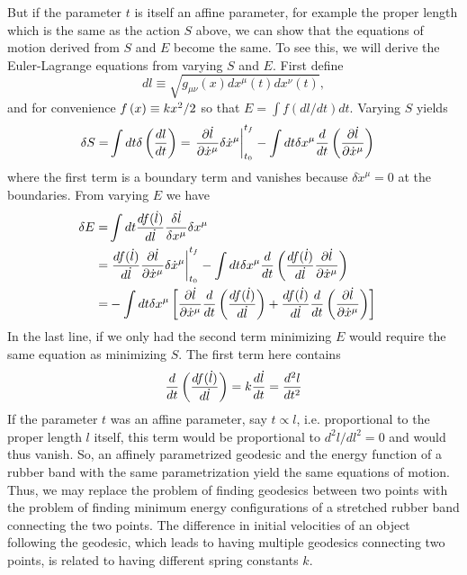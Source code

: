 \documentclass[nofootinbib,preprint,floatfix,titlepage,endfloats,superscriptaddress]{revtex4} %
\begin{document}
But if the parameter $t$ is itself an affine parameter, for example the proper length which is the same as the action $S$ above, we can   show that the equations of motion derived from $S$ and $E$ become the same. To see this, we will derive the Euler-Lagrange equations from varying $S$ and $E$. First define
\[dl \equiv \sqrt{ g_{\mu\nu}(x)dx^\mu(t) dx^\nu(t)}, \]
and for convenience $f\left(x\right) \equiv {kx^2/ 2}$ so that $E = \int f(dl/dt) dt $. Varying $S$ yields
\begin{align}
    \delta S =& \int dt \delta \left({dl \over dt}\right) = \left.{\partial \dot{l} \over \partial \dot{x}^\mu} \delta \dot{x}^\mu\right|_{t_0}^{t_f} -\int dt \delta {x}^\mu  {d\over dt} \left({\partial \dot{l} \over \partial \dot{x}^\mu}\right) 
\end{align}
where the first term is a boundary term and vanishes because $\delta \dot{x}^\mu = 0 $ at the boundaries.  
From varying $E$ we have
\begin{align}
    \delta E =& \int dt {df(\dot{l}) \over d\dot{l}} {\delta \dot{l} \over \delta x^\mu} \delta x^\mu \cr
    =& \left.{df(\dot{l}) \over d\dot{l}}{\partial \dot{l} \over \partial \dot{x}^\mu} \delta \dot{x}^\mu\right|_{t_0}^{t_f} -\int dt \delta {x}^\mu  {d\over dt} \left({df(\dot{l}) \over d\dot{l}} {\partial \dot{l} \over \partial \dot{x}^\mu}\right) \cr
    =& -\int dt \delta {x}^\mu \left[ {\partial \dot{l} \over \partial \dot{x}^\mu} {d\over dt} \left({df(\dot{l}) \over d\dot{l}}\right) + {df(\dot{l}) \over d\dot{l}} {d\over dt} \left( {\partial \dot{l} \over \partial \dot{x}^\mu}\right)\right] 
\end{align}
In the last line, if we only had the second term minimizing $E$ would require the same equation as minimizing $S$. The first term here contains 
\[{d\over dt} \left({df(\dot{l}) \over d\dot{l}}\right) = k {d \dot{l}\over dt} ={d^2 l \over dt^2} \]
If the parameter $t$ was an affine parameter, say $ t\propto l$, i.e. proportional to the proper length $l$ itself, this term would be proportional to $d^2 l / dl^2 = 0$  and would thus vanish. So, an affinely parametrized geodesic and the energy function of a rubber band with the same parametrization yield the same equations of motion. Thus, we may replace the problem of finding geodesics between two points with the problem of finding minimum energy configurations of a stretched rubber band connecting the two points. 
The difference in initial velocities of an object following the geodesic, which leads to having multiple geodesics connecting two points, is related to having different spring constants $k$. %
\end{document}
